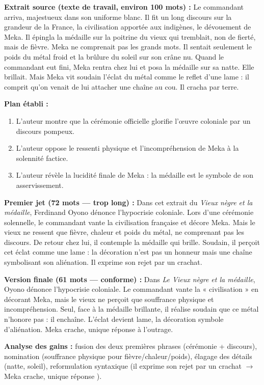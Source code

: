 \documentclass[11pt]{article}
\begin{document}
\begin{exoresolu}
\textbf{Extrait source (texte de travail, environ 100 mots) :}
\og Le commandant arriva, majestueux dans son uniforme blanc. Il fit un long discours sur la grandeur de la France, la civilisation apportée aux indigènes, le dévouement de Meka. Il épingla la médaille sur la poitrine du vieux qui tremblait, non de fierté, mais de fièvre. Meka ne comprenait pas les grands mots. Il sentait seulement le poids du métal froid et la brûlure du soleil sur son crâne nu. Quand le commandant eut fini, Meka rentra chez lui et posa la médaille sur sa natte. Elle brillait. Mais Meka vit soudain l'éclat du métal comme le reflet d'une lame : il comprit qu'on venait de lui attacher une chaîne au cou. Il cracha par terre. \fg{}

\textbf{Plan établi :}
\begin{enumerate}
    \item L'auteur montre que la cérémonie officielle glorifie l'œuvre coloniale par un discours pompeux.
    \item L'auteur oppose le ressenti physique et l'incompréhension de Meka à la solennité factice.
    \item L'auteur révèle la lucidité finale de Meka : la médaille est le symbole de son asservissement.
\end{enumerate}

\textbf{Premier jet (72 mots — trop long) :}
Dans cet extrait du \emph{Vieux nègre et la médaille}, Ferdinand Oyono dénonce l'hypocrisie coloniale. Lors d'une cérémonie solennelle, le commandant vante la civilisation française et décore Meka. Mais le vieux ne ressent que fièvre, chaleur et poids du métal, ne comprenant pas les discours. De retour chez lui, il contemple la médaille qui brille. Soudain, il perçoit cet éclat comme une lame : la décoration n'est pas un honneur mais une chaîne symbolisant son aliénation. Il exprime son rejet par un crachat.

\textbf{Version finale (61 mots — conforme) :}
Dans \emph{Le Vieux nègre et la médaille}, Oyono dénonce l'hypocrisie coloniale. Le commandant vante la « civilisation » en décorant Meka, mais le vieux ne perçoit que souffrance physique et incompréhension. Seul, face à la médaille brillante, il réalise soudain que ce métal n'honore pas : il enchaîne. L'éclat devient lame, la décoration symbole d'aliénation. Meka crache, unique réponse à l'outrage.

\textbf{Analyse des gains :} fusion des deux premières phrases (cérémonie + discours), nomination (\og souffrance physique \fg{} pour fièvre/chaleur/poids), élagage des détails (natte, soleil), reformulation syntaxique (\og il exprime son rejet par un crachat \fg{} $\rightarrow$ \og Meka crache, unique réponse \fg{}).
\end{exoresolu}
\end{document}
